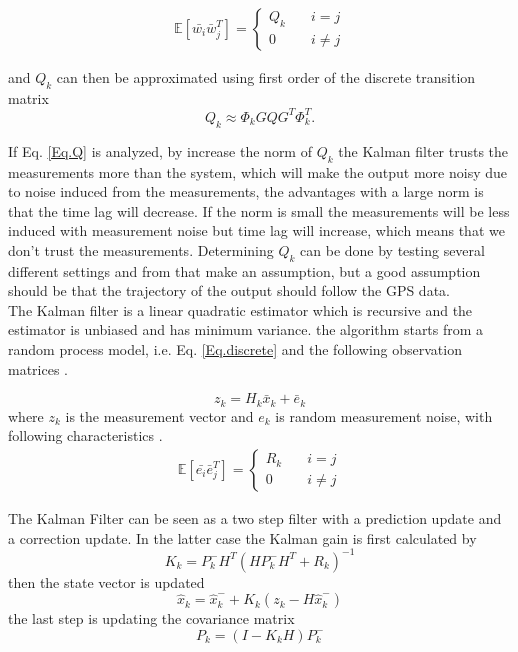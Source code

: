 \begin{align}
\mathbb{E}[\bar{w_i}\bar{w}_j^T] =
\begin{cases}
  Q_k &\quad i=j\\    
  0 &\quad i\neq j   
\end{cases}
\end{align}

and $Q_k$ can then be approximated using first order of the discrete transition matrix \cite{Discrete_kalman}
\begin{equation}
Q_k\approx \Phi_k GQG^T \Phi_k^T.
\label{Eq.Q_k}
\end{equation}

If Eq. \eqref{Eq.Q} is analyzed, by increase the norm of $Q_k$ the Kalman filter trusts the measurements more than the system, which will make the output more noisy due to noise induced from the measurements, the advantages with a large norm is that the time lag will decrease. If the norm is small the measurements will be less induced with measurement noise but time lag will increase, which means that we don't trust the measurements. Determining $Q_k$ can be done by testing several different settings and from that make an assumption, but a good assumption should be that the trajectory of the output should follow the GPS data.\\



The Kalman filter is a linear quadratic estimator which is recursive and the estimator is unbiased and has minimum variance. the algorithm starts from a random process model, i.e. Eq. \eqref{Eq.discrete} and the following observation matrices \cite{Discrete_kalman}.

\begin{equation}
z_k = H_k\bar{x}_k + \bar{e}_k
\end{equation}
where $z_k$ is the measurement vector and $e_k$ is random measurement noise, with following characteristics \cite{signal_process}.
\begin{align}
\mathbb{E}[\bar{e_i}\bar{e}_j^T] =
\begin{cases}
  R_k &\quad i=j\\    
  0 &\quad i\neq j   
\end{cases}
\end{align}

The Kalman Filter can be seen as a two step filter with a prediction update and a correction update. In the latter case the Kalman gain is first calculated by
\begin{equation}
K_k = P_k^-H^T(HP_k^-H^T+R_k)^{-1}
\end{equation}
then the state vector is updated
\begin{equation}
\hat{x}_k = \hat{x}_k^- + K_k(z_k-H\hat{x}_k^-)
\end{equation}
the last step is updating the covariance matrix
\begin{equation}
P_k = (I-K_kH)P_k^-
\end{equation}

